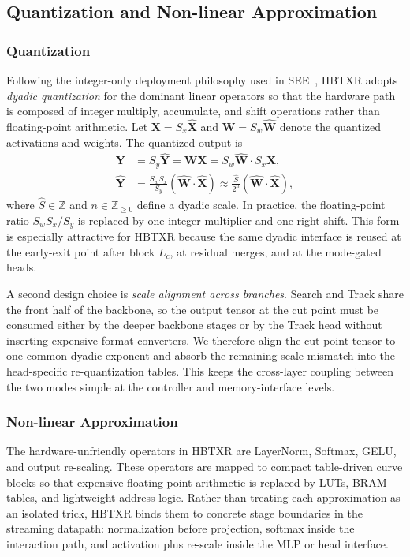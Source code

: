 \documentclass[journal]{IEEEtran}
\begin{document}
\subsection{Quantization and Non-linear Approximation}

\subsubsection{Quantization}
Following the integer-only deployment philosophy used in SEE~\cite{ref9}, HBTXR adopts \emph{dyadic quantization} for the dominant linear operators so that the hardware path is composed of integer multiply, accumulate, and shift operations rather than floating-point arithmetic. Let $\mathbf X=S_x\hat{\mathbf X}$ and $\mathbf W=S_w\hat{\mathbf W}$ denote the quantized activations and weights. The quantized output is
\begin{align}
\mathbf Y &= S_y\hat{\mathbf Y} = \mathbf W\mathbf X
          = S_w\hat{\mathbf W}\cdot S_x\hat{\mathbf X},\\
\hat{\mathbf Y}
&= \frac{S_wS_x}{S_y}\left(\hat{\mathbf W}\cdot\hat{\mathbf X}\right)
 \approx \frac{\hat S}{2^n}
 \left(\hat{\mathbf W}\cdot\hat{\mathbf X}\right),
\end{align}
where $\hat S \in \mathbb Z$ and $n\in \mathbb Z_{\ge 0}$ define a dyadic scale. In practice, the floating-point ratio $S_wS_x/S_y$ is replaced by one integer multiplier and one right shift. This form is especially attractive for HBTXR because the same dyadic interface is reused at the early-exit point after block $L_c$, at residual merges, and at the mode-gated heads.

A second design choice is \emph{scale alignment across branches}. Search and Track share the front half of the backbone, so the output tensor at the cut point must be consumed either by the deeper backbone stages or by the Track head without inserting expensive format converters. We therefore align the cut-point tensor to one common dyadic exponent and absorb the remaining scale mismatch into the head-specific re-quantization tables. This keeps the cross-layer coupling between the two modes simple at the controller and memory-interface levels.


\subsubsection{Non-linear Approximation}
The hardware-unfriendly operators in HBTXR are LayerNorm, Softmax, GELU, and output re-scaling. These operators are mapped to compact table-driven curve blocks so that expensive floating-point arithmetic is replaced by LUTs, BRAM tables, and lightweight address logic. Rather than treating each approximation as an isolated trick, HBTXR binds them to concrete stage boundaries in the streaming datapath: normalization before projection, softmax inside the interaction path, and activation plus re-scale inside the MLP or head interface.
\end{document}
